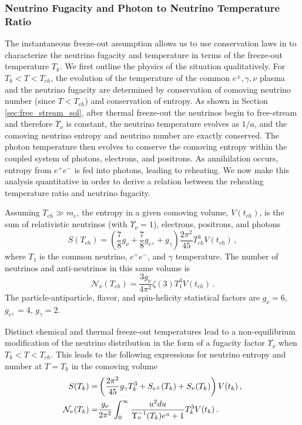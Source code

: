 \subsubsection{Neutrino Fugacity and Photon to Neutrino Temperature Ratio}\label{Tnugam}
The instantaneous freeze-out assumption allows us to use conservation laws in  to characterize the neutrino fugacity and temperature in terms of the freeze-out temperature $T_k$.  We first outline the physics of the situation qualitatively. For $T_k<T<T_{ch}$, the evolution of the temperature of the common $e^\pm,\gamma,\nu$ plasma and the neutrino fugacity are determined by conservation of comoving neutrino number (since $T<T_{ch}$) and conservation of entropy.    As shown in Section \ref{sec:free_stream_sol}, after thermal freeze-out the neutrinos begin to free-stream and therefore $\Upsilon_\nu$ is constant, the neutrino temperature evolves as $1/a$, and the comoving neutrino entropy and neutrino number are exactly conserved.  The photon temperature then evolves to conserve the comoving entropy within the coupled system of photons, electrons, and positrons.  As annihilation occurs, entropy from $e^+e^-$ is fed into photons, leading to reheating.  We now make this analysis quantitative in order to derive a relation between the reheating temperature ratio and neutrino fugacity.

Assuming $T_{ch}\gg m_e$, the entropy in a given comoving volume, $V(t_{ch})$, is the sum of relativistic neutrinos (with $\Upsilon_\nu=1$), electrons, positrons, and photons
\begin{equation}
S(T_{ch})=\left(\frac{7}{8}g_\nu+\frac{7}{8}g_{e^\pm} +g_\gamma \right)\frac{2\pi^2}{45} T_{ch}^3V(t_{ch})\,,
\end{equation}
where $T_1$ is the common neutrino, $e^+e^-$, and $\gamma$ temperature. The number of neutrinos and anti-neutrinos in this same volume is
\begin{equation}
\mathcal{N}_\nu(T_{ch})=\frac{3g_\nu}{4\pi^2}\zeta(3)T_1^3V(t_{ch})\,.
\end{equation}
The particle-antiparticle, flavor, and spin-helicity statistical factors are $g_\nu=6$, $g_{e^\pm}=4$, $g_\gamma=2$.

Distinct chemical and thermal freeze-out temperatures lead to a non-equilibrium modification of the neutrino distribution in the form of a fugacity factor $\Upsilon_\nu$ when $T_k<T<T_{ch}$.  This leads to the following expressions for neutrino entropy and number at $T=T_k$ in the comoving volume
\begin{align}
S(T_k)=&\left(\frac{2\pi^2}{45}g_\gamma T_k^3+S_{e^\pm}(T_k)+S_{\nu}(T_k)\right)V(t_k)\,,\\
\mathcal{N}_{\nu}(T_k)=&\frac{g_\nu}{2\pi^2}\int_0^\infty \frac{u^2 du}{\Upsilon_\nu^{-1}(T_k)e^u+1}T_k^3V(t_k)\,.\notag
\end{align}

